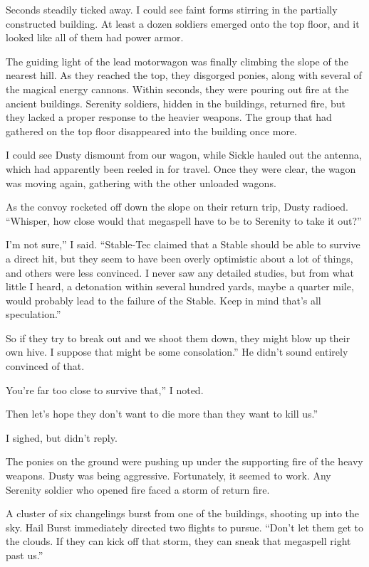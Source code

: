 Seconds steadily ticked away. I could see faint forms stirring in the partially constructed building. At least a dozen soldiers emerged onto the top floor, and it looked like all of them had power armor.

The guiding light of the lead motorwagon was finally climbing the slope of the nearest hill. As they reached the top, they disgorged ponies, along with several of the magical energy cannons. Within seconds, they were pouring out fire at the ancient buildings. Serenity soldiers, hidden in the buildings, returned fire, but they lacked a proper response to the heavier weapons. The group that had gathered on the top floor disappeared into the building once more.

I could see Dusty dismount from our wagon, while Sickle hauled out the antenna, which had apparently been reeled in for travel. Once they were clear, the wagon was moving again, gathering with the other unloaded wagons.

As the convoy rocketed off down the slope on their return trip, Dusty radioed. “Whisper, how close would that megaspell have to be to Serenity to take it out?”

\leavevmode{}I’m not sure,” I said. “Stable-Tec claimed that a Stable should be able to survive a direct hit, but they seem to have been overly optimistic about a lot of things, and others were less convinced. I never saw any detailed studies, but from what little I heard, a detonation within several hundred yards, maybe a quarter mile, would probably lead to the failure of the Stable. Keep in mind that’s all speculation.”

\leavevmode{}So if they try to break out and we shoot them down, they might blow up their own hive. I suppose that might be some consolation.” He didn’t sound entirely convinced of that.

\leavevmode{}You’re far too close to survive that,” I noted.

\leavevmode{}Then let’s hope they don’t want to die more than they want to kill us.”

I sighed, but didn’t reply.

The ponies on the ground were pushing up under the supporting fire of the heavy weapons. Dusty was being aggressive. Fortunately, it seemed to work. Any Serenity soldier who opened fire faced a storm of return fire.

A cluster of six changelings burst from one of the buildings, shooting up into the sky. Hail Burst immediately directed two flights to pursue. “Don’t let them get to the clouds. If they can kick off that storm, they can sneak that megaspell right past us.”


